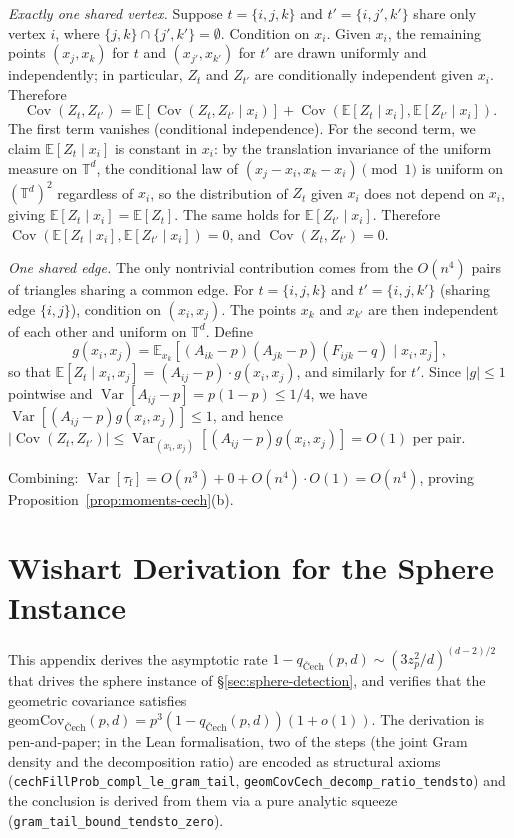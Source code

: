 \documentclass[reqno,12pt]{amsart}
\newcommand{\tauf}{\tau_{\mathrm{f}}}
\newcommand{\geomCov}{\mathrm{geomCov}}
\newcommand{\TT}{\mathbb{T}}         %
\newcommand{\EE}{\mathbb{E}}
\DeclareMathOperator{\Var}{Var}
\DeclareMathOperator{\Cov}{Cov}
\theoremstyle{plain}
\theoremstyle{definition}
\theoremstyle{remark}
\begin{document}
\smallskip
\noindent\textit{Exactly one shared vertex.} Suppose $t = \{i,j,k\}$
and $t' = \{i,j',k'\}$ share only vertex $i$, where $\{j,k\}\cap\{j',k'\}=\emptyset$.
Condition on $x_i$. Given $x_i$, the remaining points $(x_j,x_k)$ for $t$ and
$(x_{j'},x_{k'})$ for $t'$ are drawn uniformly and independently; in particular, $Z_t$ and
$Z_{t'}$ are conditionally independent given $x_i$. Therefore
\[
  \Cov(Z_t,Z_{t'}) = \EE[\Cov(Z_t,Z_{t'}\mid x_i)] + \Cov(\EE[Z_t\mid x_i],\EE[Z_{t'}\mid x_i]).
\]
The first term vanishes (conditional independence). For the second term, we claim
$\EE[Z_t\mid x_i]$ is constant in $x_i$: by the translation invariance of the uniform
measure on $\TT^d$, the conditional law of $(x_j - x_i, x_k - x_i) \pmod{1}$ is
uniform on $(\TT^d)^2$ regardless of $x_i$, so the distribution of $Z_t$ given $x_i$
does not depend on $x_i$, giving $\EE[Z_t\mid x_i] = \EE[Z_t]$. The same holds for
$\EE[Z_{t'}\mid x_i]$. Therefore $\Cov(\EE[Z_t\mid x_i],\EE[Z_{t'}\mid x_i]) = 0$,
and $\Cov(Z_t,Z_{t'}) = 0$.

\smallskip
\noindent\textit{One shared edge.} The only nontrivial contribution
comes from the $O(n^4)$ pairs of triangles sharing a common edge. For $t=\{i,j,k\}$ and
$t'=\{i,j,k'\}$ (sharing edge $\{i,j\}$), condition on $(x_i,x_j)$. The points $x_k$ and
$x_{k'}$ are then independent of each other and uniform on $\TT^d$. Define
\[
  g(x_i,x_j) = \EE_{x_k}[(A_{ik}-p)(A_{jk}-p)(F_{ijk}-q)\mid x_i,x_j],
\]
so that $\EE[Z_t \mid x_i,x_j] = (A_{ij}-p)\cdot g(x_i,x_j)$, and similarly for $t'$.
Since $|g|\leq 1$ pointwise and $\Var[A_{ij}-p] = p(1-p)\leq 1/4$, we have
$\Var[(A_{ij}-p)g(x_i,x_j)]\leq 1$, and hence
$|\Cov(Z_t,Z_{t'})|\leq \Var_{(x_i,x_j)}[(A_{ij}-p)g(x_i,x_j)] = O(1)$ per pair.

\smallskip
Combining: $\Var[\tauf] = O(n^3) + 0 + O(n^4)\cdot O(1) = O(n^4)$, proving
Proposition~\ref{prop:moments-cech}(b).

\section{Wishart Derivation for the Sphere Instance}\label{app:wishart}

This appendix derives the asymptotic rate
$1 - q_{\text{\v{C}ech}}(p, d) \sim (3 z_p^2 / d)^{(d-2)/2}$
that drives the sphere instance of \S\ref{sec:sphere-detection}, and verifies that
the geometric covariance satisfies
$\geomCov_{\text{\v{C}ech}}(p, d) = p^3 (1 - q_{\text{\v{C}ech}}(p, d)) (1 + o(1))$.
The derivation is pen-and-paper; in the Lean formalisation, two of the steps
(the joint Gram density and the decomposition ratio) are encoded as structural
axioms (\texttt{cechFillProb\_compl\_le\_gram\_tail},
\texttt{geomCovCech\_decomp\_ratio\_tendsto}) and the conclusion is derived from
them via a pure analytic squeeze (\texttt{gram\_tail\_bound\_tendsto\_zero}).
\end{document}

